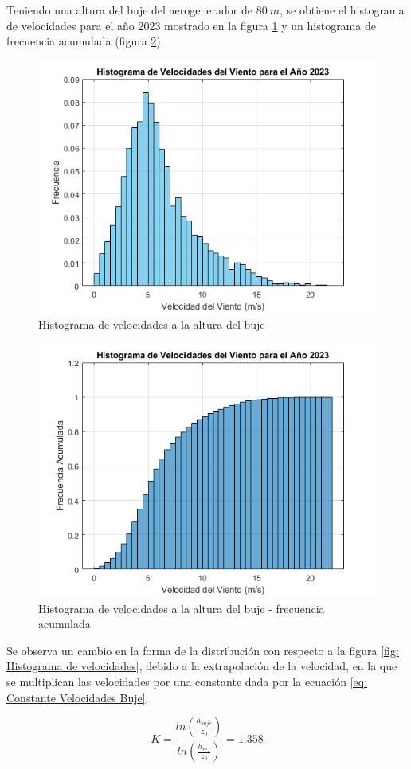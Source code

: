 \documentclass{IEEEtran}
\begin{document}
Teniendo una altura del buje del aerogenerador de $80\ m$, se obtiene el histograma de velocidades para el año 2023 mostrado en la figura \ref{fig: Histograma de velocidades Buje} y un histograma de frecuencia acumulada (figura \ref{fig: Histograma de velocidades Frecuencia Acumulada Buje}).

\begin{figure}[h]
    \centering
    \includegraphics[width = 0.5 \textwidth]{Imagenes/Histograma de Velocidades Buje.png}
    \caption{Histograma de velocidades a la altura del buje}
    \label{fig: Histograma de velocidades Buje}
\end{figure}

\begin{figure}[h]
    \centering
    \includegraphics[width = 0.5 \textwidth]{Imagenes/Histograma de Velocidades Buje Frec Acumulada.png}
    \caption{Histograma de velocidades a la altura del buje - frecuencia acumulada}
    \label{fig: Histograma de velocidades Frecuencia Acumulada Buje}
\end{figure}

Se observa un cambio en la forma de la distribución con respecto a la figura \ref{fig: Histograma de velocidades}, debido a la extrapolación de la velocidad, en la que se multiplican las velocidades por una constante dada por la ecuación \ref{eq: Constante Velocidades Buje}.

\begin{equation}
    K = \frac{ln \left( \frac{h_{buje}}{z_0} \right)}{ln \left( \frac{h_{ref}}{z_0} \right)} = 1.358
    \label{eq: Constante Velocidades Buje}
\end{equation}
\end{document}
